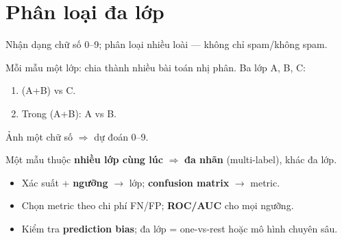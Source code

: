 \documentclass[12pt,a4paper]{article}
\begin{document}
\newpage

\section{Phân loại đa lớp}

\begin{dongco}[title={Hơn hai lớp}]
Nhận dạng chữ số 0--9; phân loại nhiều loài --- không chỉ spam/không spam.
\end{dongco}

\begin{phuongphap}[title={One-vs-rest}]
Mỗi mẫu một lớp: chia thành nhiều bài toán nhị phân. Ba lớp A, B, C:
\begin{enumerate}
  \item (A+B) vs C.
  \item Trong (A+B): A vs B.
\end{enumerate}
\end{phuongphap}

\begin{vidu}[title={Chữ số viết tay}]
Ảnh một chữ số $\Rightarrow$ dự đoán 0--9.
\end{vidu}

\begin{luuy}[title={Đa nhãn}]
Một mẫu thuộc \textbf{nhiều lớp cùng lúc} $\Rightarrow$ \textbf{đa nhãn} (multi-label), khác đa lớp.
\end{luuy}

\begin{tongket}[title={Tổng kết chương --- Phân loại}]
\begin{itemize}
  \item Xác suất + \textbf{ngưỡng} $\to$ lớp; \textbf{confusion matrix} $\to$ metric.
  \item Chọn metric theo chi phí FN/FP; \textbf{ROC/AUC} cho mọi ngưỡng.
  \item Kiểm tra \textbf{prediction bias}; đa lớp = one-vs-rest hoặc mô hình chuyên sâu.
\end{itemize}
\end{tongket}
\end{document}
